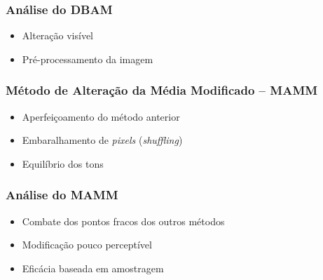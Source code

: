 \documentclass{beamer}
\begin{document}
\begin{frame}
\frametitle{Análise do DBAM}

\begin{itemize}
\item Alteração visível \newline
\item Pré-processamento da imagem \newline
\end{itemize}
\end{frame}


\begin{frame}
\frametitle{Método de Alteração da Média Modificado -- MAMM}

\begin{itemize}
\item Aperfeiçoamento do método anterior \newline
\item Embaralhamento de \textit{pixels} (\textit{shuffling}) \newline
\item Equilíbrio dos tons
\end{itemize}

\end{frame}

\begin{frame}
\frametitle{Análise do MAMM}

\begin{itemize}
\item Combate dos pontos fracos dos outros métodos \newline
\item Modificação pouco perceptível \newline
\item Eficácia baseada em amostragem
\end{itemize}

\end{frame}

\end{document}
